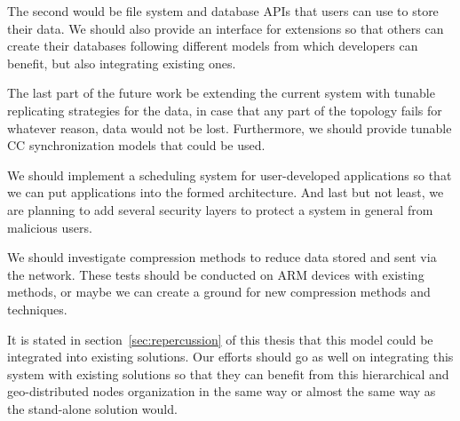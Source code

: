 \noindent
The second would be file system and database APIs that users can use to store their data. We should also provide an interface for extensions so that others can create their databases following different models from which developers can benefit, but also integrating existing ones.

The last part of the future work be extending the current system with tunable replicating strategies for the data, in case that any part of the topology fails for whatever reason, data would not be lost. Furthermore, we should provide tunable CC synchronization models that could be used.

We should implement a scheduling system for user-developed applications so that we can put applications into the formed architecture. And last but not least, we are planning to add several security layers to protect a system in general from malicious users.

We should investigate compression methods to reduce data stored and sent via the network. These tests should be conducted on ARM devices with existing methods, or maybe we can create a ground for new compression methods and techniques.

It is stated in section~\ref{sec:repercussion} of this thesis that this model could be integrated into existing solutions. Our efforts should go as well on integrating this system with existing solutions so that they can benefit from this hierarchical and geo-distributed nodes organization in the same way or almost the same way as the stand-alone solution would.
%
%